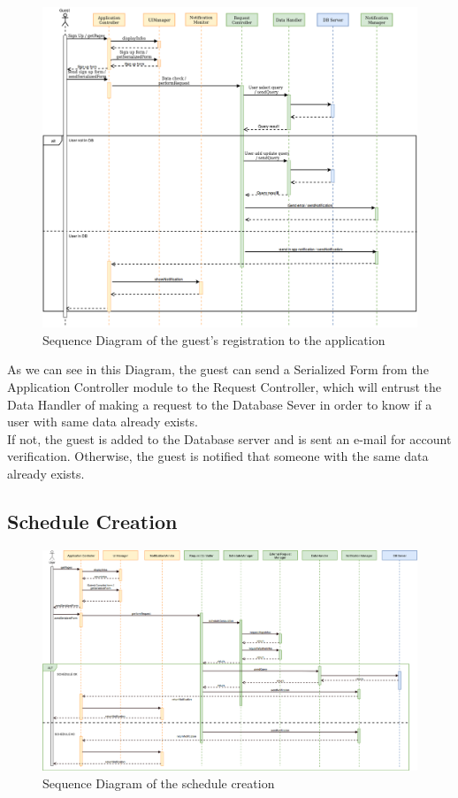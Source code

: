 \documentclass[numbers=noenddot, 12pt, a4paper, oneside]{scrbook}
\begin{document}
\begin{figure}[H]
	\centering
	\includegraphics[width=1.1\textwidth,angle=-0]{images/Goal1}
	\caption{Sequence Diagram of the guest's registration to the application}
\end{figure}

As we can see in this Diagram, the guest can send a Serialized Form from the Application Controller module to the Request Controller, which will entrust the Data Handler of making a request to the Database Sever in order to know if a user with same data already exists.\\

If not, the guest is added to the Database server and is sent an e-mail for account verification. Otherwise, the guest is notified that someone with the same data already exists.

\subsection*{Schedule Creation}

\begin{figure}[H]
	\centering
	\includegraphics[width=1.1\textwidth,angle=-0]{images/Goal2}
	\caption{Sequence Diagram of the schedule creation}
\end{figure}
\end{document}
